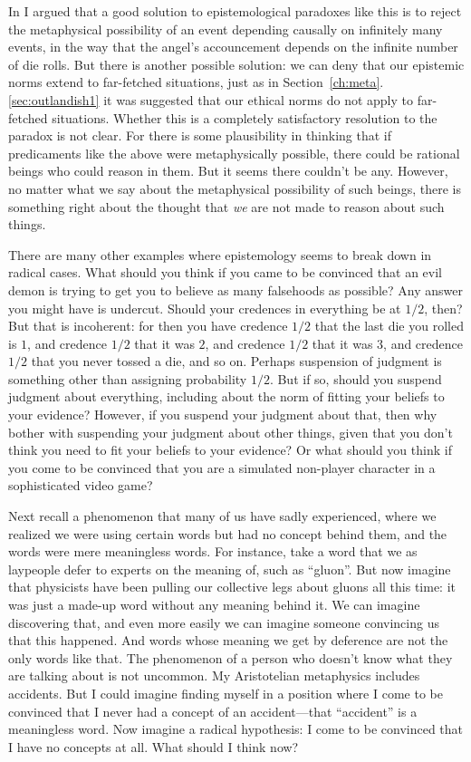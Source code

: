 In  I argued that a good solution to epistemological paradoxes like this is to reject the metaphysical possibility
of an event depending causally on infinitely many events, in the way that the angel's accouncement depends on the infinite
number of die rolls. But there is another possible solution: we can deny that our epistemic norms extend to far-fetched
situations, just as in Section~\ref{ch:meta}.\ref{sec:outlandish1} it was suggested that our ethical norms do not apply to far-fetched situations. Whether this is 
a completely satisfactory resolution to the paradox is not clear. For there is some plausibility in thinking that if 
predicaments like the above were metaphysically possible, there could be rational beings who could reason
in them. But it seems there couldn't be any. However, no matter what we say about the metaphysical possibility of such beings,
there is something right about the thought that \textit{we} are not made to reason about such things.

There are many other examples where epistemology seems to break down in radical cases. What should you think if you came to be
convinced that an evil demon is trying to get you to believe as many falsehoods as possible? Any answer you might have is undercut. Should your credences in everything be at $1/2$, then? But that is incoherent: for then you have credence $1/2$
that the last die you rolled is $1$, and credence $1/2$ that it was $2$, and credence $1/2$ that it was $3$, and credence $1/2$
that you never tossed a die, and so on. Perhaps suspension of judgment is something other than assigning probability $1/2$. But 
if so, should you suspend judgment about everything, including about the norm of fitting your beliefs to your evidence? However,
if you suspend your judgment about that, then why bother with suspending your judgment about other things, given that you don't 
think you need to fit your beliefs to your evidence? Or what should you think if you come to be convinced that you are a  
simulated non-player character in a sophisticated video game? 

Next recall a phenomenon that many of us have sadly experienced, where we realized we were using certain words but had no concept behind them, and
the words were mere meaningless words. For instance, take a word that we as laypeople defer to experts on the meaning of, such
as ``gluon''. But now imagine that physicists have been pulling our collective legs about gluons all this time: it was just a 
made-up word without any meaning behind it. We can imagine discovering that, and even more easily we can imagine
someone convincing us that this happened. And words whose meaning we get by deference are not
the only words like that. The phenomenon of a person who doesn't know what they are talking about is not uncommon. My Aristotelian metaphysics
includes accidents. But I could imagine finding myself in a position where I come to be convinced that I never had a concept of
an accident---that ``accident'' is a meaningless word. Now imagine a radical hypothesis: I come to be convinced that I have no
concepts at all. What should I think now? 

